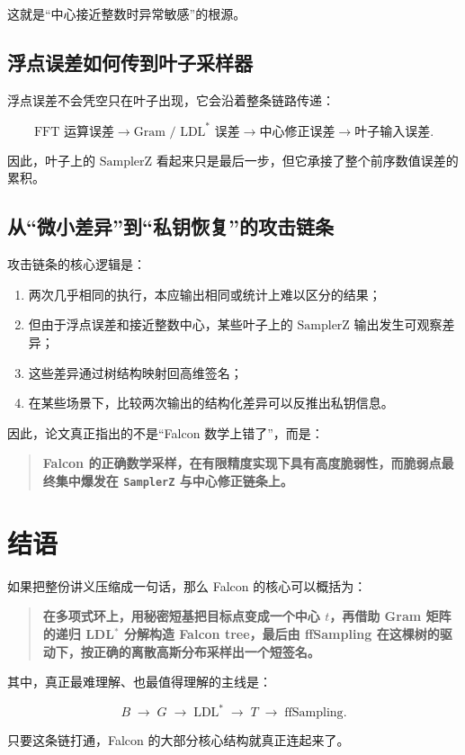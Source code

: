 \documentclass[11pt,a4paper]{ctexart}
\begin{document}
这就是“中心接近整数时异常敏感”的根源。

\subsection{浮点误差如何传到叶子采样器}

浮点误差不会凭空只在叶子出现，它会沿着整条链路传递：

\[
\text{FFT 运算误差}
\to
\text{Gram / LDL}^*\text{ 误差}
\to
\text{中心修正误差}
\to
\text{叶子输入误差}.
\]

因此，叶子上的 \(\mathrm{SamplerZ}\) 看起来只是最后一步，但它承接了整个前序数值误差的累积。

\subsection{从“微小差异”到“私钥恢复”的攻击链条}

攻击链条的核心逻辑是：

\begin{enumerate}
    \item 两次几乎相同的执行，本应输出相同或统计上难以区分的结果；
    \item 但由于浮点误差和接近整数中心，某些叶子上的 \(\mathrm{SamplerZ}\) 输出发生可观察差异；
    \item 这些差异通过树结构映射回高维签名；
    \item 在某些场景下，比较两次输出的结构化差异可以反推出私钥信息。
\end{enumerate}

因此，论文真正指出的不是“Falcon 数学上错了”，而是：

\begin{quote}
\textbf{Falcon 的正确数学采样，在有限精度实现下具有高度脆弱性，而脆弱点最终集中爆发在 \texttt{SamplerZ} 与中心修正链条上。}
\end{quote}

\section*{结语}

如果把整份讲义压缩成一句话，那么 Falcon 的核心可以概括为：

\begin{quote}
\textbf{在多项式环上，用秘密短基把目标点变成一个中心 \(t\)，再借助 Gram 矩阵的递归 LDL\(^*\) 分解构造 Falcon tree，最后由 ffSampling 在这棵树的驱动下，按正确的离散高斯分布采样出一个短签名。}
\end{quote}

其中，真正最难理解、也最值得理解的主线是：

\[
B \;\longrightarrow\; G \;\longrightarrow\; \text{LDL}^* \;\longrightarrow\; T \;\longrightarrow\; \text{ffSampling}.
\]

只要这条链打通，Falcon 的大部分核心结构就真正连起来了。
\end{document}
